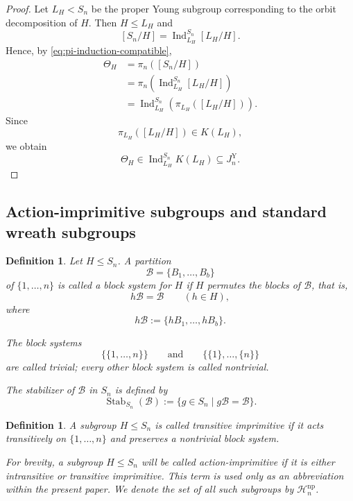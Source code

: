 \documentclass[a4paper,11pt]{article}
\numberwithin{equation}{section}
\newtheorem{definition}[theorem]{Definition}
\newcommand{\Ind}{\operatorname{Ind}}
\begin{document}
\begin{proof}
Let $L_H<S_n$ be the proper Young subgroup corresponding to the orbit
decomposition of $H$. Then $H\le L_H$ and
\[
  [S_n/H]
  =
  \Ind_{L_H}^{S_n}[L_H/H].
\]
Hence, by \eqref{eq:pi-induction-compatible},
\[
\begin{aligned}
  \Theta_H
  &=
  \pi_n([S_n/H])\\
  &=
  \pi_n\left(
    \Ind_{L_H}^{S_n}[L_H/H]
  \right)\\
  &=
  \Ind_{L_H}^{S_n}
  \left(
    \pi_{L_H}([L_H/H])
  \right).
\end{aligned}
\]
Since
\[
  \pi_{L_H}([L_H/H])\in K(L_H),
\]
we obtain
\[
  \Theta_H
  \in
  \Ind_{L_H}^{S_n}K(L_H)
  \subseteq
  J_n^{\mathrm Y}.
\]
\end{proof}

\subsection{Action-imprimitive subgroups and standard wreath subgroups}
\label{subsec:action-imprimitive}

\begin{definition}\label{def:block-system}
Let $H\le S_n$. A partition
\[
  \mathcal B=\{B_1,\ldots,B_b\}
\]
of $\{1,\ldots,n\}$ is called a \emph{block system} for $H$ if $H$ permutes
the blocks of $\mathcal B$, that is,
\[
  h\mathcal B=\mathcal B
  \qquad
  (h\in H),
\]
where
\[
  h\mathcal B
  :=
  \{hB_1,\ldots,hB_b\}.
\]

The block systems
\[
  \bigl\{\{1,\ldots,n\}\bigr\}
  \qquad\text{and}\qquad
  \bigl\{\{1\},\ldots,\{n\}\bigr\}
\]
are called \emph{trivial}; every other block system is called
\emph{nontrivial}.

The stabilizer of $\mathcal B$ in $S_n$ is defined by
\[
  \operatorname{Stab}_{S_n}(\mathcal B)
  :=
  \{g\in S_n\mid g\mathcal B=\mathcal B\}.
\]
\end{definition}

\begin{definition}\label{def:action-imprimitive-subgroup}
A subgroup $H\le S_n$ is called \emph{transitive imprimitive} if it acts
transitively on $\{1,\ldots,n\}$ and preserves a nontrivial block system.

For brevity, a subgroup $H\le S_n$ will be called \emph{action-imprimitive}
if it is either intransitive or transitive imprimitive. This term is used only
as an abbreviation within the present paper. We denote the set of all such
subgroups by $\mathcal H_n^{\mathrm{np}}$.
\end{definition}
\end{document}
